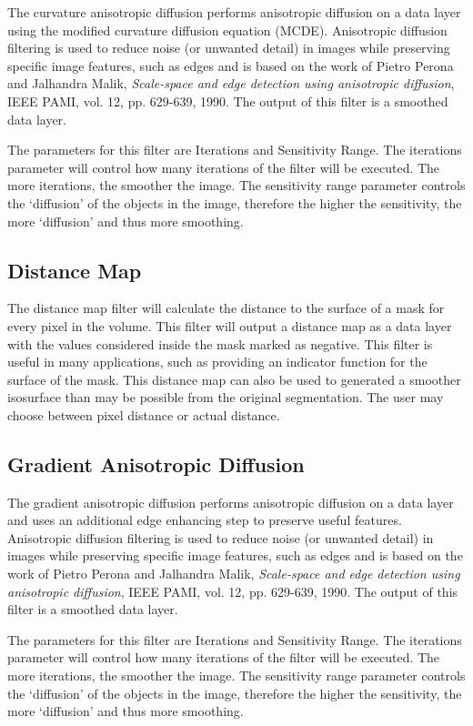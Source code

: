 \documentclass[fleqn,11pt,openany]{book}
\begin{document}
The curvature anisotropic diffusion performs anisotropic diffusion on a data layer using the modified curvature diffusion equation (MCDE).  Anisotropic diffusion filtering is used to reduce noise (or unwanted detail) in images while preserving specific image features, such as edges and is based on the work of Pietro Perona and Jalhandra Malik, \emph{Scale-space and edge detection using anisotropic diffusion}, IEEE PAMI, vol. 12, pp. 629-639, 1990.  The output of this filter is a smoothed data layer.

The parameters for this filter are Iterations and Sensitivity Range.  The iterations parameter will control how many iterations of the filter will be executed.  The more iterations, the smoother the image.  The sensitivity range parameter controls the `diffusion' of the objects in the image, therefore the higher the sensitivity, the more `diffusion' and thus more smoothing.  

\subsection{Distance Map}

The distance map filter will calculate the distance to the surface of a mask  for every pixel in the volume.  This filter will output a distance map as a data layer with the values considered inside the mask marked as negative.  This filter is useful in many applications, such as providing an indicator function for the surface of the mask.  This distance map can also be used to generated a smoother isosurface than may be possible from the original segmentation.  The user may choose between pixel distance or actual distance.  

\subsection{Gradient Anisotropic Diffusion}

The gradient anisotropic diffusion performs anisotropic diffusion on a data layer and uses an additional edge enhancing step to preserve useful features.  Anisotropic diffusion filtering is used to reduce noise (or unwanted detail) in images while preserving specific image features, such as edges and is based on the work of Pietro Perona and Jalhandra Malik, \emph{Scale-space and edge detection using anisotropic diffusion}, IEEE PAMI, vol. 12, pp. 629-639, 1990.  The output of this filter is a smoothed data layer.

The parameters for this filter are Iterations and Sensitivity Range.  The iterations parameter will control how many iterations of the filter will be executed.  The more iterations, the smoother the image.  The sensitivity range parameter controls the `diffusion' of the objects in the image, therefore the higher the sensitivity, the more `diffusion' and thus more smoothing. 
\end{document}
